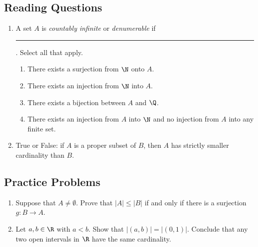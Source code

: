 
  

\subsection*{Reading Questions}

\begin{enumerate}
    \item A set $A$ is \emph{countably infinite} or \emph{denumerable} if \rule{3cm}{0.15mm}. Select all that apply.
    \begin{enumerate}
        \item There exists a surjection from $\N$ onto $A$.
        \item There exists an injection from $\N$ into $A$.
        \item There exists a bijection between $A$ and $\Q$.
        \item There exists an injection from $A$ into $\N$ and no injection from $A$ into any finite set.
    \end{enumerate}
    
    \item True or False: if $A$ is a proper subset of $B$, then $A$ has strictly smaller cardinality than $B$.
\end{enumerate}

\subsection*{Practice Problems}

\begin{enumerate}\renewcommand{\labelenumi}{\thesubsection.\theenumi}
\item Suppose that $A \neq \emptyset$. Prove that $|A| \leq |B|$ if and only if there is a surjection $g : B \to A$.

\item Let $a,b \in \R$ with $a < b$. Show that $|(a,b)| = |(0,1)|$. Conclude that any two open intervals in $\R$ have the same cardinality. 
\end{enumerate}

